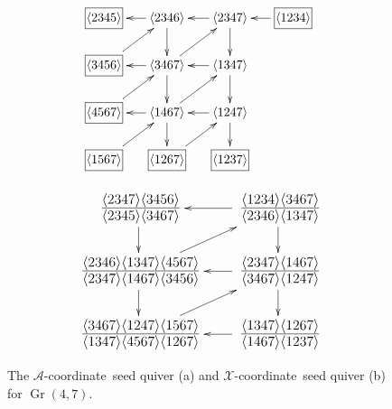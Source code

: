\documentclass[11pt]{article}
\DeclareMathOperator{\Gr}{Gr}
\def\ket#1{\langle #1 \rangle}
\def\xcoord{$\mathcal{X}$-coordinate}
\def\acoord{$\mathcal{A}$-coordinate}
\begin{document}
\begin{figure}
\centering
\begin{subfigure}[b]{0.45\textwidth}
\begin{equation*}
\begin{gathered}
\begin{xy} 0;<-.5pt,0pt>:<0pt,-.5pt>::
         (-100,0) *+{\framebox[7ex]{$\ket{1234}$}} ="0",
	(0,0) *+{\ket{2347}} ="1",
	(100,0) *+{\ket{2346}} ="2",
	(200,0) *+{\framebox[7ex]{$\ket{2345}$}} ="3",
	(0,75) *+{\ket{1347}} ="4",
	(100,75) *+{\ket{3467}} ="5",
	(200,75) *+{\framebox[7ex]{$\ket{3456}$}} ="6",
	(0,150) *+{\ket{1247}} ="7",
	(100,150) *+{\ket{1467}} ="8",
	(200,150) *+{\framebox[7ex]{$\ket{4567}$}} ="9",
	(0,225) *+{\framebox[7ex]{$\ket{1237}$}} ="10",
	(100,225) *+{\framebox[7ex]{$\ket{1267}$}} ="11",
	(200,225) *+{\framebox[7ex]{$\ket{1567}$}} ="12",
	"0", {\ar"1"},
	"1", {\ar"2"},
	"2", {\ar"3"},
	"4", {\ar"5"},
	"5", {\ar"6"},
	"7", {\ar"8"},
	"8", {\ar"9"},
	"1", {\ar"4"},
	"2", {\ar"5"},
	"4", {\ar"7"},
	"5", {\ar"8"},
	"7", {\ar"10"},
	"8", {\ar"11"},
	"5", {\ar"1"},
	"6", {\ar"2"},
	"8", {\ar"4"},
	"9", {\ar"5"},
	"11", {\ar"7"},
	"12", {\ar"8"},
\end{xy}
\end{gathered} 
\end{equation*} 
\caption{} \label{fig:g47-a-seed}
\end{subfigure}
\hspace*{\fill} 
\begin{subfigure}[b]{0.45\textwidth}
\begin{equation*}
\begin{gathered}
\begin{xy} 0;<-.5pt,0pt>:<0pt,-.5pt>::
	(0,0) *+\txt{\fontsize{16pt}{16pt} $\frac{\ket{1234}\ket{3467}}{\ket{2346}\ket{1347}}$} ="1",
	(220,0) *+\txt{\fontsize{16pt}{16pt} $\frac{\ket{2347}\ket{3456}}{\ket{2345}\ket{3467}}$} ="2",
	(0,100) *+\txt{\fontsize{16pt}{16pt} $\frac{\ket{2347}\ket{1467}}{\ket{3467}\ket{1247}}$} ="4",
	(220,100) *+\txt{\fontsize{16pt}{16pt} $\frac{\ket{2346}\ket{1347}\ket{4567}}{\ket{2347}\ket{1467}\ket{3456}}$} ="5",
	(0,200) *+\txt{\fontsize{16pt}{16pt} $\frac{\ket{1347}\ket{1267}}{\ket{1467}\ket{1237}}$} ="7",
	(220,200) *+\txt{\fontsize{16pt}{16pt} $\frac{\ket{3467}\ket{1247}\ket{1567}}{\ket{1347}\ket{4567}\ket{1267}}$} ="8",
	"1", {\ar"2"},
	"4", {\ar"5"},
	"7", {\ar"8"},
	"1", {\ar"4"},
	"2", {\ar"5"},
	"4", {\ar"7"},
	"5", {\ar"8"},
	"5", {\ar"1"},
	"8", {\ar"4"},
\end{xy}
\end{gathered} 
\end{equation*} 
\caption{} \label{fig:g47-x-seed}
\end{subfigure}
\caption{The \acoord\ seed quiver (a) and \xcoord\ seed quiver (b) for $\Gr(4,7)$.} 
\label{fig:g47-seed}
\end{figure}
\end{document}
